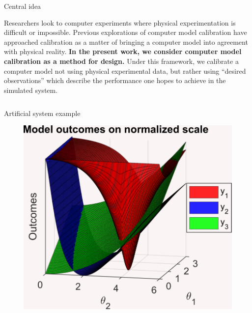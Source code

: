 \documentclass[final]{beamer}
\newlength{\onecolwid}
\newlength{\twocolwid}
\begin{document}
\begin{frame}[t]
\begin{columns}[t]
\begin{column}{\twocolwid}

\begin{alertblock}{Central idea}

Researchers look to computer experiments where physical experimentation is difficult or impossible\cite{Sacks1989,Santner2003a}. Previous explorations of computer model calibration have approached calibration as a matter of bringing a computer model into agreement with physical reality\cite{Bayarri2007,Kennedy2001,Higdon2004,Williams2006}. \textbf{In the present work, we consider computer model calibration as a method for design.} Under this framework, we calibrate a computer model not using physical experimental data, but rather using ``desired observations'' which describe the performance one hopes to achieve in the simulated system. 

\end{alertblock} 


\begin{columns}[t,totalwidth=\twocolwid] %

\begin{column}{\onecolwid}\vspace{-.6in} %


\begin{alertblock}{Artificial system example}


\begin{figure}[h!]
\includegraphics[width=0.6\linewidth]{FIG_toy_sim_model_outputs}
\label{blade}
\end{figure}


\end{alertblock}
\end{column}
\end{columns}
\end{column}
\end{columns}
\end{frame}
\end{document}
